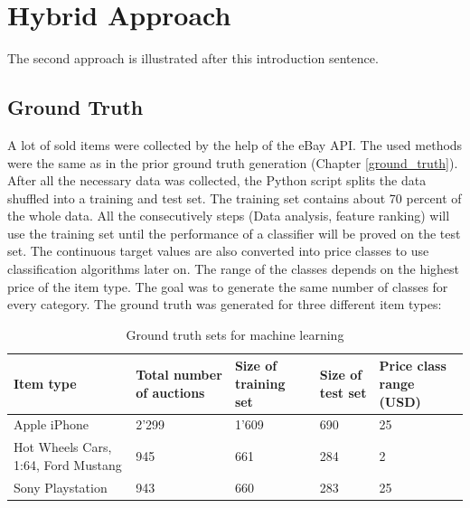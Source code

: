 \section{Hybrid Approach}
The second approach is illustrated after this introduction sentence.
\subsection{Ground Truth}
A lot of sold items were collected by the help of the eBay API. The used methods were the same as in the prior ground truth generation (Chapter \ref{ground_truth}). After all the necessary data was collected, the Python script splits the data shuffled into a training and test set. The training set contains about 70 percent of the whole data. All the consecutively steps (Data analysis, feature ranking) will use the training set until the performance of a classifier will be proved on the test set. The continuous target values are also converted into price classes to use classification algorithms later on. The range of the classes depends on the highest price of the item type. The goal was to generate the same number of classes for every category. The ground truth was generated for three different item types:
\begin{table}[h!]
	\begin{center}
	\begin{tabular}{| p{2.6cm} | p{2.6cm} | p{2.6cm} | p{2.6cm} | p{2.6cm} |}
		\hline
		\textbf{Item type} & \textbf{Total number of auctions} & \textbf{Size of training set} & \textbf{Size of test set} & \textbf{Price class range (USD)} \\
		\hline
		Apple iPhone & 2'299 & 1'609 & 690 & 25 \\
		\hline
		Hot Wheels Cars, 1:64, Ford Mustang & 945 & 661 & 284 & 2 \\
		\hline
		Sony Playstation & 943 & 660 & 283 & 25 \\
		\hline
	\end{tabular}
	\end{center}
	\caption{Ground truth sets for machine learning}
\end{table}
